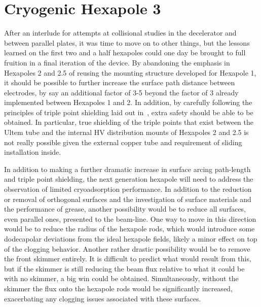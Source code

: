 


\section{Cryogenic Hexapole 3}

After an interlude for attempts at collisional studies in the decelerator and between parallel plates, it was time to move on to other things, but the lessons learned on the first two and a half hexapoles could one day be brought to full fruition in a final iteration of the device.
By abandoning the emphasis in Hexapoles 2 and 2.5 of reusing the mounting structure developed for Hexapole 1, it should be possible to further increase the surface path distance between electrodes, by say an additional factor of 3-5 beyond the factor of 3 already implemented between Hexapoles 1 and 2.
In addition, by carefully following the principles of triple point shielding laid out in~\citep[Sec.~4.3.3]{Faircloth2013}, extra safety should be able to be obtained.
In particular, true shielding of the triple points that exist between the Ultem tube and the internal HV distribution mounts of Hexapoles 2 and 2.5 is not really possible given the external copper tube and requirement of sliding installation inside.

In addition to making a further dramatic increase in surface arcing path-length and triple point shielding, the next generation hexapole will need to address the observation of limited cryoadsorption performance.
In addition to the reduction or removal of orthogonal surfaces and the investigation of surface materials and the performance of grease, another possibility would be to reduce all surfaces, even parallel ones, presented to the beam-line.
One way to move in this direction would be to reduce the radius of the hexapole rods, which would introduce some dodecapolar deviations from the ideal hexapole fields, likely a minor effect on top of the clogging behavior.
Another rather drastic possibility would be to remove the front skimmer entirely.
It is difficult to predict what would result from this, but if the skimmer is still reducing the beam flux relative to what it could be with no skimmer, a big win could be obtained.
Simultaneously, without the skimmer the flux onto the hexapole rods would be significantly increased, exacerbating any clogging issues associated with these surfaces.


